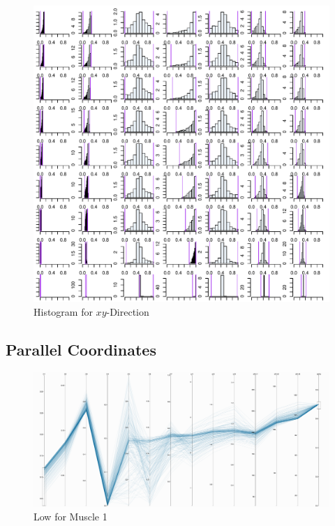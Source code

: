 \begin{figure}[ht]
   \begin{center}
    \includegraphics[width=1.0\textwidth]{figs/XY_alphaProgression.pdf}
  \end{center}
  \caption{Histogram for $xy$-Direction}
  \label{fig_xyhisto}
\end{figure}

\subsection{Parallel Coordinates}

\begin{figure}[ht]
   \begin{center}
    \includegraphics[width=1.0\textwidth]{figs/X_a8_lower.png}
  \end{center}
  \caption{Low for Muscle 1}
  \label{fig_low}
\end{figure}

